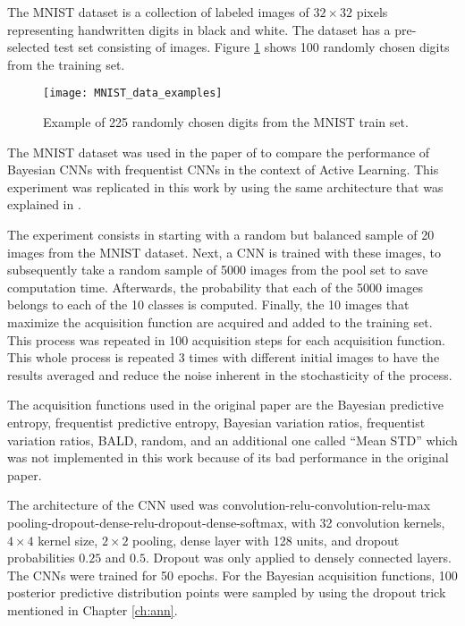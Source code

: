 The MNIST dataset is a collection of  labeled images of $32 \times 32$ pixels representing handwritten digits in black and white. The dataset has a pre-selected test set consisting of  images. Figure \ref{fig:MNIST_data_examples} shows 100 randomly chosen digits from the training set.

\begin{figure}[H]
    \centering
    \texttt{[image: MNIST\_data\_examples]}
    \caption{Example of 225 randomly chosen digits from the MNIST train set.}
    \label{fig:MNIST_data_examples}
\end{figure}

The MNIST dataset was used in the paper of \citeauthor{Gal2016Active} to compare the performance of Bayesian CNNs with frequentist CNNs in the context of Active Learning. This experiment was replicated in this work by using the same architecture that was explained in \cite{Gal2016Active}.

The experiment consists in starting with a random but balanced sample of 20 images from the MNIST dataset. Next, a CNN is trained with these images, to subsequently take a random sample of 5000 images from the pool set to save computation time. Afterwards, the probability that each of the 5000 images belongs to each of the 10 classes is computed. Finally, the 10 images that maximize the acquisition function are acquired and added to the training set. This process was repeated in 100 acquisition steps for each acquisition function. This whole process is repeated 3 times with different initial images to have the results averaged and reduce the noise inherent in the stochasticity of the process.

The acquisition functions used in the original paper are the Bayesian predictive entropy, frequentist predictive entropy, Bayesian variation ratios, frequentist variation ratios, BALD, random, and an additional one called ``Mean STD'' which was not implemented in this work because of its bad performance in the original paper.

The architecture of the CNN used was convolution-relu-convolution-relu-max pooling-dropout-dense-relu-dropout-dense-softmax, with 32 convolution kernels, $4 \times 4$ kernel size, $2 \times 2$ pooling, dense layer with 128 units, and dropout probabilities $0.25$ and $0.5$. Dropout was only applied to densely connected layers. The CNNs were trained for 50 epochs. For the Bayesian acquisition functions, 100 posterior predictive distribution points were sampled by using the dropout trick mentioned in Chapter \ref{ch:ann}.

